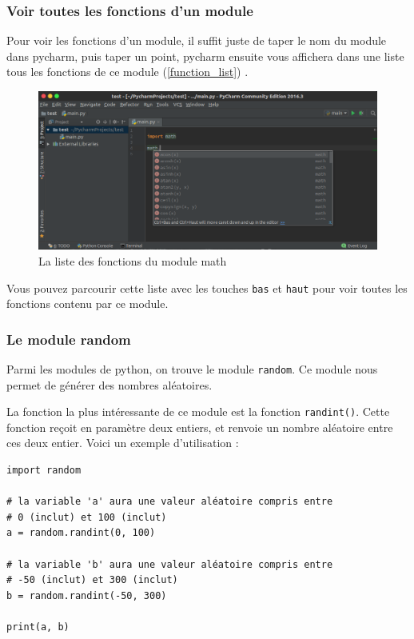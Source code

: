 \documentclass[12pt]{article}
\newcommand{\code}[1]{\colorbox{light-gray}{\texttt{#1}}}
\begin{document}
        \subsubsection{Voir toutes les fonctions d'un module}
            Pour voir les fonctions d'un module, il suffit juste de taper le nom du module dans pycharm, puis taper un
            point, pycharm ensuite vous affichera dans une liste tous les fonctions de ce module
            (\autoref{function_list}) .

            \begin{figure}[H]
                \centering
                \includegraphics[width=\linewidth]{img/18_modules.png}
                \caption{La liste des fonctions du module math}
                \label{function_list}
            \end{figure}

            Vous pouvez parcourir cette liste avec les touches \code{bas} et \code{haut} pour voir toutes les fonctions
            contenu par ce module.

        \subsubsection{Le module random}
            Parmi les modules de python, on trouve le module \code{random}. Ce module nous permet de générer des
            nombres aléatoires.

            La fonction la plus intéressante de ce module est la fonction \code{randint()}. Cette fonction reçoit en
            paramètre deux entiers, et renvoie un nombre aléatoire entre ces deux entier. Voici un exemple
            d'utilisation :
            \begin{lstlisting}[style=code, breaklines=false]
import random

# la variable 'a' aura une valeur aléatoire compris entre
# 0 (inclut) et 100 (inclut)
a = random.randint(0, 100)

# la variable 'b' aura une valeur aléatoire compris entre
# -50 (inclut) et 300 (inclut)
b = random.randint(-50, 300)

print(a, b)
            \end{lstlisting}
\end{document}
